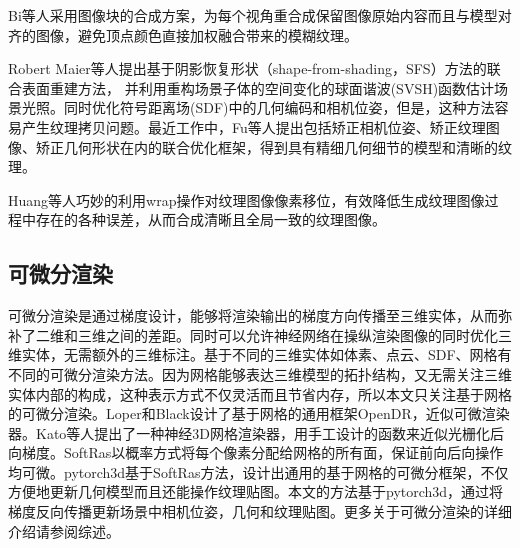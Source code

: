 \vspace*{2mm}Bi等人采用图像块的合成方案，为每个视角重合成保留图像原始内容而且与模型对齐的图像，避免顶点颜色直接加权融合带来的模糊纹理。\par
\vspace*{2mm}Robert Maier等人提出基于阴影恢复形状（shape-from-shading，SFS）方法的联合表面重建方法，
并利用重构场景子体的空间变化的球面谐波(SVSH)函数估计场景光照。同时优化符号距离场(SDF)中的几何编码和相机位姿，但是，这种方法容易产生纹理拷贝问题。最近工作中，Fu等人提出包括矫正相机位姿、矫正纹理图像、矫正几何形状在内的联合优化框架，得到具有精细几何细节的模型和清晰的纹理。\par
\vspace*{2mm}Huang等人巧妙的利用wrap操作对纹理图像像素移位，有效降低生成纹理图像过程中存在的各种误差，从而合成清晰且全局一致的纹理图像。

\subsection{可微分渲染}
可微分渲染是通过梯度设计，能够将渲染输出的梯度方向传播至三维实体，从而弥补了二维和三维之间的差距。同时可以允许神经网络在操纵渲染图像的同时优化三维实体，无需额外的三维标注。基于不同的三维实体如体素、点云、SDF、网格有不同的可微分渲染方法。因为网格能够表达三维模型的拓扑结构，又无需关注三维实体内部的构成，这种表示方式不仅灵活而且节省内存，所以本文只关注基于网格的可微分渲染。Loper和Black设计了基于网格的通用框架OpenDR，近似可微渲染器。Kato等人提出了一种神经3D网格渲染器，用手工设计的函数来近似光栅化后向梯度。SoftRas以概率方式将每个像素分配给网格的所有面，保证前向后向操作均可微。pytorch3d基于SoftRas方法，设计出通用的基于网格的可微分框架，不仅方便地更新几何模型而且还能操作纹理贴图。本文的方法基于pytorch3d，通过将梯度反向传播更新场景中相机位姿，几何和纹理贴图。更多关于可微分渲染的详细介绍请参阅综述。

%
%
